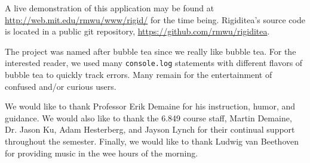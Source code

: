 \documentclass[aps,prd,final,twocolumn,letterpaper,nofootinbib]{revtex4-1}
\begin{document}
A live demonstration of this application may be found at
\url{http://web.mit.edu/rmwu/www/rigid/} for the time being.
Rigiditea's source code is located in a public git repository,
\url{https://github.com/rmwu/rigiditea}.

The project was named after bubble tea since we really like bubble tea.
For the interested reader, we used many \texttt{console.log} statements
with different flavors of bubble tea to quickly track errors.
Many remain for the entertainment of confused and/or curious users.

\begin{acknowledgments}
We would like to thank Professor Erik Demaine for his instruction,
humor, and guidance. We would also like to thank the 6.849 course staff,
Martin Demaine, Dr. Jason Ku, Adam Hesterberg, and Jayson Lynch
for their continual support throughout the semester.
Finally, we would like to thank Ludwig van Beethoven for providing
music in the wee hours of the morning.
\end{acknowledgments}

{}

\end{document}
